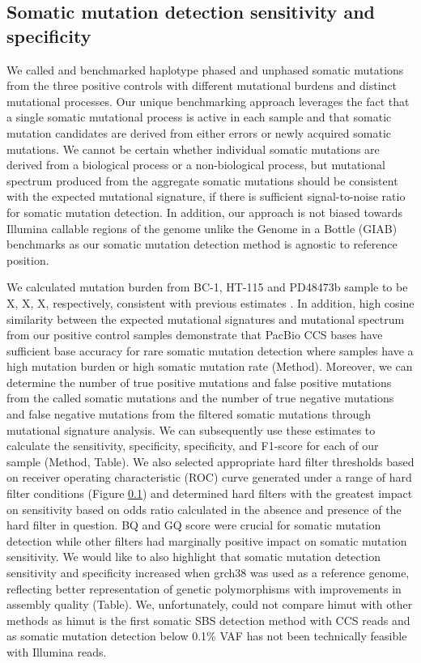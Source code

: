 \subsection{Somatic mutation detection sensitivity and specificity}

We called and benchmarked haplotype phased and unphased somatic mutations from the three positive controls with different mutational burdens and distinct mutational processes. Our unique benchmarking approach leverages the fact that a single somatic mutational process is active in each sample and that somatic mutation candidates are derived from either errors or newly acquired somatic mutations. We cannot be certain whether individual somatic mutations are derived from a biological process or a non-biological process, but mutational spectrum produced from the aggregate somatic mutations should be consistent with the expected mutational signature, if there is sufficient signal-to-noise ratio for somatic mutation detection. In addition, our approach is not biased towards Illumina callable regions of the genome unlike the Genome in a Bottle (GIAB) benchmarks \cite{} as our somatic mutation detection method is agnostic to reference position. 

We calculated mutation burden from BC-1, HT-115 and PD48473b sample to be X, X, X, respectively, consistent with previous estimates \cite{}. In addition, high cosine similarity between the expected mutational signatures and mutational spectrum from our positive control samples demonstrate that PacBio CCS bases have sufficient base accuracy for rare somatic mutation detection where samples have a high mutation burden or high somatic mutation rate (Method). Moreover, we can determine the number of true positive mutations and false positive mutations from the called somatic mutations and the number of true negative mutations and false negative mutations from the filtered somatic mutations through mutational signature analysis. We can subsequently use these estimates to calculate the sensitivity, specificity, specificity, and F1-score for each of our sample (Method, Table). We also selected appropriate hard filter thresholds based on receiver operating characteristic (ROC) curve generated under a range of hard filter conditions (Figure \ref{}) and determined hard filters with the greatest impact on sensitivity based on odds ratio calculated in the absence and presence of the hard filter in question. BQ and GQ score were crucial for somatic mutation detection while other filters had marginally positive impact on somatic mutation sensitivity. We would like to also highlight that somatic mutation detection sensitivity and specificity increased when grch38 was used as a reference genome, reflecting better representation of genetic polymorphisms with improvements in assembly quality (Table). We, unfortunately, could not compare himut with other methods as himut is the first somatic SBS detection method with CCS reads and as somatic mutation detection below 0.1\% VAF has not been technically feasible with Illumina reads. 

